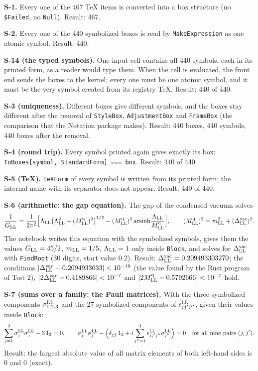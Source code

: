 \documentclass[
  10pt,
]{article}
\begin{document}
\textbf{S-1.} Every one of the 467 TeX items is converted into a box
structure (no \texttt{\$Failed}, no \texttt{Null}). Result: 467.

\textbf{S-2.} Every one of the 440 symbolized boxes is read by
\texttt{MakeExpression} as one atomic symbol. Result: 440.

\textbf{S-14 (the typed symbols).} One input cell contains all 440
symbols, each in its printed form, as a reader would type them. When the
cell is evaluated, the front end sends the boxes to the kernel; every
one must be one atomic symbol, and it must be the very symbol created
from its registry TeX. Result: 440 of 440.

\textbf{S-3 (uniqueness).} Different boxes give different symbols, and
the boxes stay different after the removal of \texttt{StyleBox},
\texttt{AdjustmentBox} and \texttt{FrameBox} (the comparison that the
Notation package makes). Result: 440 boxes, 440 symbols, 440 boxes after
the removal.

\textbf{S-4 (round trip).} Every symbol printed again gives exactly its
box: \texttt{ToBoxes{[}symbol,\ StandardForm{]}\ ===\ box}. Result: 440
of 440.

\textbf{S-5 (TeX).} \texttt{TeXForm} of every symbol is written from its
printed form; the internal name with its separator does not appear.
Result: 440 of 440.

\textbf{S-6 (arithmetic: the gap equation).} The gap of the condensed
vacuum solves
\[\frac{1}{G_{\rm LL}}=\frac{1}{2\pi^2}\Big[\Lambda_{\rm LL}\big(\Lambda_{\rm LL}^2+(M^{\rm q}_{\rm LL})^2\big)^{1/2}-(M^{\rm q}_{\rm LL})^2\,{\rm arsinh}\frac{\Lambda_{\rm LL}}{M^{\rm q}_{\rm LL}}\Big],\qquad (M^{\rm q}_{\rm LL})^2=m_{\rm LL}^2+(\Delta^{\rm vac}_{\rm LL})^2 .\]
The notebook writes this equation with the symbolized symbols, gives
them the values \(G_{\rm LL}=45/2\), \(m_{\rm LL}=1/5\),
\(\Lambda_{\rm LL}=1\) only inside \texttt{Block}, and solves for
\(\Delta^{\rm vac}_{\rm LL}\) with \texttt{FindRoot} (30 digits, start
value 0.2). Result: \(\Delta^{\rm vac}_{\rm LL}=0.209493303270\); the
conditions
\(\lvert\Delta^{\rm vac}_{\rm LL}-0.2094933033\rvert<10^{-10}\) (the
value found by the Rust program of Test 2),
\(\lvert2\Delta^{\rm vac}_{\rm LL}-0.4189866\rvert<10^{-7}\) and
\(\lvert2M^{\rm q}_{\rm LL}-0.5792666\rvert<10^{-7}\) hold.

\textbf{S-7 (sums over a family: the Pauli matrices).} With the three
symbolized components \(\sigma^{\rm LL}_{1,2,3}\) and the 27 symbolized
components of \(\epsilon^{\rm LL}_{jj'j''}\), given their values inside
\texttt{Block}:
\[\sum_{j=1}^3\sigma^{\rm LL}_j\sigma^{\rm LL}_j-3\,\mathsf 1_2=0,\qquad \sigma^{\rm LL}_j\sigma^{\rm LL}_{j'}-\Big(\delta_{jj'}\mathsf 1_2+i\sum_{j''=1}^3\epsilon^{\rm LL}_{jj'j''}\sigma^{\rm LL}_{j''}\Big)=0\quad\text{for all nine pairs }(j,j').\]
Result: the largest absolute value of all matrix elements of both
left-hand sides is 0 and 0 (exact).
\end{document}
